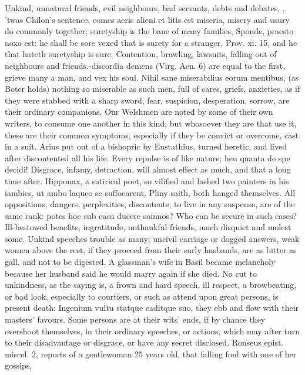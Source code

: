 {Unkind, unnatural friends, evil neighbours, bad servants, debts and
debates, \etc{}, 'twas Chilon's sentence, comes aeris alieni et litis est
miseria, misery and usury do commonly together; suretyship is the bane
of many families, Sponde, praesto noxa est: he shall be sore vexed that
is surety for a stranger, Prov. xi. 15, and he that hateth suretyship
is sure. Contention, brawling, lawsuits, falling out of neighbours and
friends.-discordia demens (Virg. Aen. 6) are equal to the first,
grieve many a man, and vex his soul. Nihil sane miserabilius eorum
mentibus, (as Boter holds) nothing so miserable as such men, full
of cares, griefs, anxieties, as if they were stabbed with a sharp
sword, fear, suspicion, desperation, sorrow, are their ordinary
companions. Our Welshmen are noted by some of their own writers,
to consume one another in this kind; but whosoever they are that use
it, these are their common symptoms, especially if they be convict or
overcome, cast in a suit. Arius put out of a bishopric by
Eustathius, turned heretic, and lived after discontented all his life.
Every repulse is of like nature; heu quanta de spe decidi!
Disgrace, infamy, detraction, will almost effect as much, and that a
long time after. Hipponax, a satirical poet, so vilified and lashed two
painters in his iambics, ut ambo laqueo se suffocarent, Pliny
saith, both hanged themselves. All oppositions, dangers, perplexities,
discontents, to live in any suspense, are of the same rank: potes
hoc sub casu ducere somnos? Who can be secure in such cases?
Ill-bestowed benefits, ingratitude, unthankful friends, much disquiet
and molest some. Unkind speeches trouble as many; uncivil carriage or
dogged answers, weak women above the rest, if they proceed from their
surly husbands, are as bitter as gall, and not to be digested. A
glassman's wife in Basil became melancholy because her husband said he
would marry again if she died. No cut to unkindness, as the saying is,
a frown and hard speech, ill respect, a browbeating, or bad look,
especially to courtiers, or such as attend upon great persons, is
present death: Ingenium vultu statque caditque suo, they ebb and flow
with their masters' favours. Some persons are at their wits' ends, if
by chance they overshoot themselves, in their ordinary speeches, or
actions, which may after turn to their disadvantage or disgrace, or
have any secret disclosed. Ronseus epist. miscel. 2, reports of a
gentlewoman 25 years old, that falling foul with one of her gossips,
}
